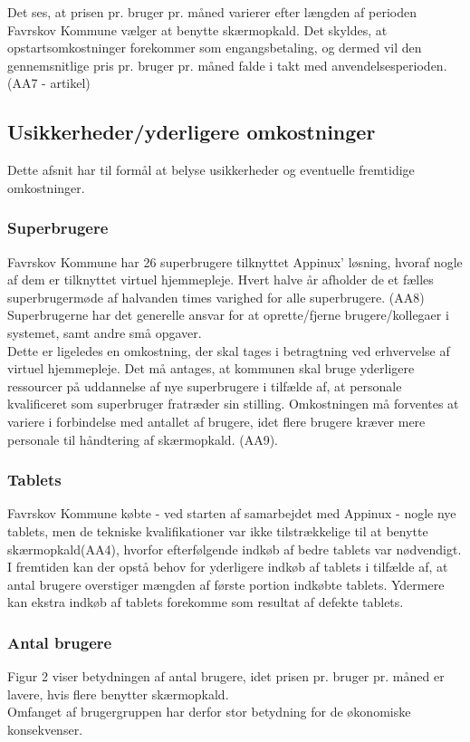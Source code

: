 Det ses, at prisen pr. bruger pr. måned varierer efter længden af perioden Favrskov Kommune vælger at benytte skærmopkald. Det skyldes, at opstartsomkostninger forekommer som engangsbetaling, og dermed vil den gennemsnitlige pris pr. bruger pr. måned falde i takt med anvendelsesperioden. 
(AA7 - artikel)
\subsection{Usikkerheder/yderligere omkostninger}
Dette afsnit har til formål at belyse usikkerheder og eventuelle fremtidige omkostninger. 

\subsubsection{Superbrugere}
Favrskov Kommune har 26 superbrugere tilknyttet Appinux’ løsning, hvoraf nogle af dem er tilknyttet virtuel hjemmepleje. Hvert halve år afholder de et fælles superbrugermøde af halvanden times varighed for alle superbrugere. (AA8)\\
Superbrugerne har det generelle ansvar for at oprette/fjerne brugere/kollegaer i systemet, samt andre små opgaver. \\
Dette er ligeledes en omkostning, der skal tages i betragtning ved erhvervelse af virtuel hjemmepleje. Det må antages, at kommunen skal bruge yderligere ressourcer på uddannelse af nye superbrugere i tilfælde af, at personale kvalificeret som superbruger fratræder sin stilling. 
Omkostningen må forventes at variere i forbindelse med antallet af brugere, idet flere brugere kræver mere personale til håndtering af skærmopkald. (AA9).

\subsubsection{Tablets}
Favrskov Kommune købte - ved starten af samarbejdet med Appinux - nogle nye tablets, men de tekniske kvalifikationer var ikke tilstrækkelige til at benytte skærmopkald(AA4), hvorfor efterfølgende indkøb af bedre tablets var nødvendigt.\\
I fremtiden kan der opstå behov for yderligere indkøb af tablets i tilfælde af, at antal brugere overstiger mængden af første portion indkøbte tablets. Ydermere kan ekstra indkøb af tablets forekomme som resultat af defekte tablets.

\subsubsection{Antal brugere}
Figur 2 viser betydningen af antal brugere, idet prisen pr. bruger pr. måned er lavere, hvis flere benytter skærmopkald.\\
Omfanget af brugergruppen har derfor stor betydning for de økonomiske konsekvenser. 

